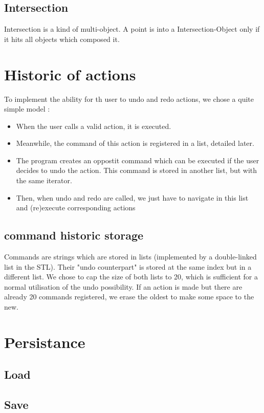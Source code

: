 \documentclass[a4paper, 12pts]{article}
\begin{document}
    \subsection{Intersection}
        Intersection is a kind of multi-object. A point is into a Intersection-Object only if it hits all objects which composed it.

\section{Historic of actions}
    To implement the ability for th user to undo and redo actions, we chose a quite simple model :
    \begin{itemize}
        \item When the user calls a valid action, it is executed.
        \item Meanwhile, the command of this action is registered in a list, detailed later.
        \item The program creates an oppostit command which can be executed if the user decides to undo the action.
        This command is stored in another list, but with the same iterator.
        \item Then, when undo and redo are called, we just have to navigate in this list and (re)execute corresponding
        actions
    \end{itemize}

    \subsection{command historic storage}
        Commands are strings which are stored in lists (implemented by a double-linked list in the STL). Their "undo
        counterpart" is stored at the same index but in a different list. We chose to cap the size of both lists to 20,
        which is sufficient for a normal utilisation of the undo possibility. If an action is made but there are
        already 20 commands registered, we erase the oldest to make some space to the new.

\section{Persistance}
    \subsection{Load}
    \subsection{Save}
\end{document}
